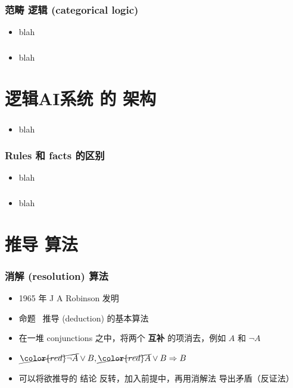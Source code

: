 \documentclass[17pt]{beamer}
\begin{document}
\begin{frame}
\frametitle{范畴 逻辑 (categorical logic)}
\begin{itemize}
	\item blah
\end{itemize}
\end{frame}

\begin{frame}
\frametitle{}
\begin{itemize}
	\item blah
\end{itemize}
\end{frame}

\section[Section]{逻辑AI系统 的 架构}
\frame{\sectionpage}

\begin{frame}
\frametitle{}
\begin{itemize}
	\item blah
\end{itemize}
\end{frame}


\begin{frame}
\frametitle{Rules 和 facts 的区别}
\begin{itemize}
	\item blah
\end{itemize}
\end{frame}



\begin{frame}
\frametitle{}
\begin{itemize}
	\item blah
\end{itemize}
\end{frame}

\section[Section]{推导 算法}
\frame{\sectionpage}

\begin{frame}
\frametitle{消解 (resolution) 算法}
\begin{itemize}
	\item 1965 年 J A Robinson 发明
	\item 命题 {\color{red}\ 推导} (deduction) 的基本算法
	\item 在一堆 conjunctions 之中，将两个 \textbf{互补} 的项消去，例如 $A$ 和 $\neg A$
	\item $\cancel{\color{red}\neg A} \vee B, \cancel{\color{red}A} \vee B \Rightarrow B$
	\item 可以将欲推导的 结论 反转，加入前提中，再用消解法 导出矛盾（反证法）
\end{itemize}
\end{frame}
\end{document}
